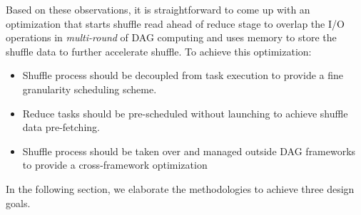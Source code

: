 Based on these observations, it is straightforward to come up with an optimization that starts shuffle read ahead of reduce stage to overlap the I/O operations in \textit{multi-round} of DAG computing and uses memory to store the shuffle data to further accelerate shuffle. To achieve this optimization:
\begin{itemize}
	\item Shuffle process should be decoupled from task execution to provide a fine granularity scheduling scheme.
	\item Reduce tasks should be pre-scheduled without launching to achieve shuffle data pre-fetching.
	\item Shuffle process should be taken over and managed outside DAG frameworks to provide a cross-framework optimization
\end{itemize}
In the following section, we elaborate the methodologies to achieve three design goals.
